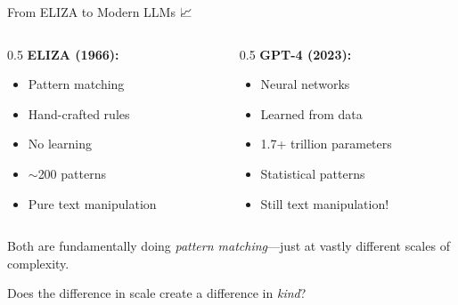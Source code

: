 \documentclass[aspectratio=169]{beamer}
\begin{document}
\begin{frame}[shrink=10]{From ELIZA to Modern LLMs 📈}
\small
\begin{columns}
\begin{column}{0.5\textwidth}
\textbf{ELIZA (1966):}
\begin{itemize}\setlength{\itemsep}{0pt}
    \item Pattern matching
    \item Hand-crafted rules
    \item No learning
    \item $\sim$200 patterns
    \item Pure text manipulation
\end{itemize}
\end{column}

\begin{column}{0.5\textwidth}
\textbf{GPT-4 (2023):}
\begin{itemize}\setlength{\itemsep}{0pt}
    \item Neural networks
    \item Learned from data
    \item 1.7+ trillion parameters
    \item Statistical patterns
    \item Still text manipulation!
\end{itemize}
\end{column}
\end{columns}

\vspace{0.3cm}

\begin{thinkaboutit}
Both are fundamentally doing \textit{pattern matching}—just at vastly different scales of complexity.

Does the difference in scale create a difference in \textit{kind}?
\end{thinkaboutit}
\end{frame}
\end{document}

